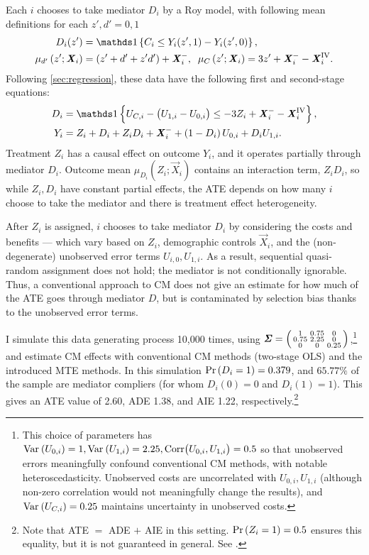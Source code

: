 Each $i$ chooses to take mediator $D_i$ by a Roy model, with following mean definitions for each $z', d' = 0, 1$
\begin{align*}
    D_i(z') &= \indicator{C_i \leq Y_i(z', 1) - Y_i(z', 0)},  \\
    \mu_{d'}\left(z' ; \vec X_i \right) &= \left( z' + d' + z' d' \right) + \vec X_i^-,
    \;\; \mu_{C}\left(z' ; \vec X_i \right) = 3z' + \vec X_i^- - \vec X_i^{\text{IV}}.
\end{align*}
Following \autoref{sec:regression}, these data have the following first and second-stage equations:
\begin{align*}
    D_i &= \indicator{U_{C,i} - \big( U_{1,i} - U_{0,i} \big)
    \leq -3Z_i + \vec X_i^- - \vec X_i^{\text{IV}}},  \\
    Y_i &= Z_i + D_i + Z_i D_i + \vec X_i^-
        + \left( 1 - D_i \right) U_{0,i} + D_i U_{1,i}.
\end{align*}
Treatment $Z_i$ has a causal effect on outcome $Y_i$, and it operates partially through mediator $D_i$.
Outcome mean $\mu_{D_i}\left( Z_i; \vec X_i \right)$ contains an interaction term, $Z_i D_i$, so while $Z_i,D_i$ have constant partial effects, the ATE depends on how many $i$ choose to take the mediator and there is treatment effect heterogeneity.

After $Z_i$ is assigned, $i$ chooses to take mediator $D_i$ by considering the costs and benefits --- which vary based on $Z_i$, demographic controls $\vec X_i$, and the (non-degenerate) unobserved error terms $U_{i,0}, U_{1,i}$.
As a result, sequential quasi-random assignment does not hold; the mediator is not conditionally ignorable.
Thus, a conventional approach to CM does not give an estimate for how much of the ATE goes through mediator $D$, but is contaminated by selection bias thanks to the unobserved error terms.

I simulate this data generating process 10,000 times, using $\boldsymbol{\mathit{\Sigma}} =
\left(\begin{smallmatrix} 1 & 0.75 & 0 \\ 0.75 & 2.25 & 0 \\ 0 & 0 & 0.25 \end{smallmatrix}\right)$,\footnote{
    This choice of parameters has $\text{Var}_{} \left( U_{0,i} \right) = 1, \text{Var}_{} \left( U_{1,i} \right) = 2.25, \text{Corr}\big(U_{0,i}, U_{1,i}\big) = 0.5$ so that unobserved errors meaningfully confound conventional CM methods, with notable heteroscedasticity.
    Unobserved costs are uncorrelated with $U_{0,i}, U_{1,i}$ (although non-zero correlation would not meaningfully change the results), and $\text{Var}_{} \left( U_{C,i} \right) = 0.25$ maintains uncertainty in unobserved costs.
}
and estimate CM effects with conventional CM methods (two-stage OLS) and the introduced MTE methods.
In this simulation $\Pr\left( D_i = 1 \right) = 0.379$, and $65.77\%$ of the sample are mediator compliers (for whom $D_i(0)=0$ and $D_i(1)=1$).
This gives an ATE value of 2.60, ADE 1.38, and AIE 1.22, respectively.\footnote{
    Note that ATE $=$ ADE $+$ AIE in this setting.
    $\Pr\left( Z_i=1 \right) = 0.5$ ensures this equality, but it is not guaranteed in general.
    See .
}

